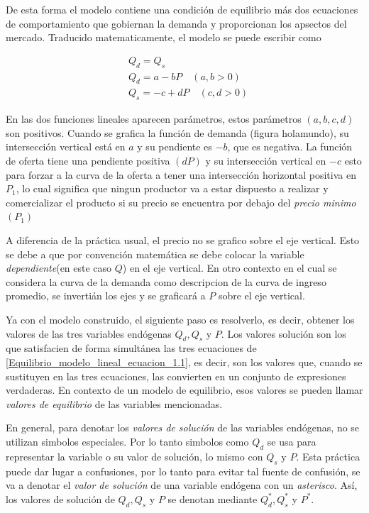 De esta forma el modelo contiene una condición de equilibrio más dos ecuaciones de comportamiento que gobiernan la demanda y proporcionan los apsectos del mercado. Traducido matematicamente, el modelo se puede escribir como 

\begin{equation}
\label{Equilibrio_modelo_lineal_ecuacion_1.1}
\begin{aligned}
& Q_d = Q_s \\
& Q_d = a - bP \quad (a,b > 0) \\
& Q_s = -c + dP \quad (c,d > 0)
\end{aligned}
\end{equation}

En las dos funciones lineales aparecen parámetros, estos parámetros \((a,b,c,d)\) son positivos. Cuando se grafica la función de demanda (figura holamundo), su intersección vertical está en \(a\) y su pendiente es \(-b\), que es negativa. La función de oferta tiene una pendiente positiva \((dP)\) y su intersección vertical en \(-c\) esto para forzar a la curva de la oferta a tener una intersección horizontal positiva en \(P_1\), lo cual significa que ningun productor va a estar dispuesto a realizar y comercializar el producto si su precio se encuentra por debajo del \textit{precio minimo} \((P_1)\)

A diferencia de la práctica usual, el precio no se grafico sobre el eje vertical. Esto se debe a que por convención matemática se debe colocar la variable \textit{dependiente}(en este caso \(Q\)) en el eje vertical. En otro contexto en el cual se considera la curva de la demanda como descripcion de la curva de ingreso promedio, se invertián los ejes y se graficará a \(P\) sobre el eje vertical.

Ya con el modelo construido, el siguiente paso es resolverlo, es decir, obtener los valores de las tres variables endógenas \(Q_d, Q_s\) y \(P\). Los valores solución son los que satisfacien de forma simultánea las tres ecuaciones de \ref{Equilibrio_modelo_lineal_ecuacion_1.1}, es decir, son los valores que, cuando se sustituyen en las tres ecuaciones, las convierten en un conjunto de expresiones verdaderas. En contexto de un modelo de equilibrio, esos valores se pueden llamar \textit{valores de equilibrio} de las variables mencionadas.

En general, para denotar los \textit{valores de solución} de las variables endógenas, no se utilizan simbolos especiales. Por lo tanto simbolos como \(Q_d\) se usa para representar la variable o su valor de solución, lo mismo con \(Q_s\) y \(P\). Esta práctica puede dar lugar a confusiones, por lo tanto para evitar tal fuente de confusión, se va a denotar el \textit{valor de solución} de una variable endógena con un \textit{asterisco}. Así, los valores de solución de \(Q_d, Q_s\) y \(P\) se denotan mediante \(Q_d^\ast, Q_s^\ast\) y \(P^\ast\). 

